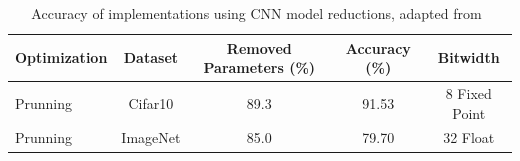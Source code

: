 \begin{table}[]
	\centering
	\begin{tabular}{|l|c|c|c|c|}
		\hline
		\multicolumn{1}{|c|}{\textbf{Optimization}} & \textbf{Dataset}  & \textbf{Removed Parameters (\%)} & \textbf{Accuracy (\%)} & \textbf{Bitwidth}       \\ \hline
		Prunning~\cite{Hal_model_reduction_ref45}                           & Cifar10  & 89.3                    & 91.53         & 8 Fixed Point  \\ \hline
		Prunning~\cite{Hal_model_reduction_ref7}                           & ImageNet & 85.0                    & 79.70     & 32 Float       \\ \hline
	\end{tabular}
	\caption{Accuracy of implementations using CNN model reductions, adapted from~\cite{hal:accelCNNonFPGA}}
	\label{tab:model_reduction_comp}
\end{table}





